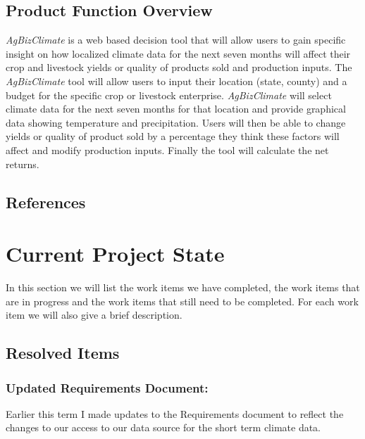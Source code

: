 \documentclass[onecolumn, draftclsnofoot,10pt, compsoc]{article}
\begin{document}
		\subsection{Product Function Overview}
		    \textit{AgBizClimate} is a web based decision tool that will allow users to gain specific insight on how localized climate data for the next seven months will affect their crop and livestock yields or quality of products sold and production inputs. The \textit{AgBizClimate} tool will allow users to input their location (state, county) and a budget for the specific crop or livestock enterprise. \textit{AgBizClimate} will select climate data for the next seven months for that location and provide graphical data showing temperature and precipitation. Users will then be able to change yields or quality of product sold by a percentage they think these factors will affect and modify production inputs. Finally the tool will calculate the net returns.\\



		\renewcommand\refname{\vskip -1cm}
		\subsection{References}

		    \nocite{*}
            
            


\section{Current Project State}
In this section we will list the work items we have completed, the work items that are in progress and the work items that still need to be completed. For each work item we will also give a brief description.\\

	\subsection{Resolved Items}
		\subsubsection{Updated Requirements Document:}
		Earlier this term I made updates to the Requirements document to reflect the changes to our access to our data source for the short term climate data.\\
		
\end{document}
